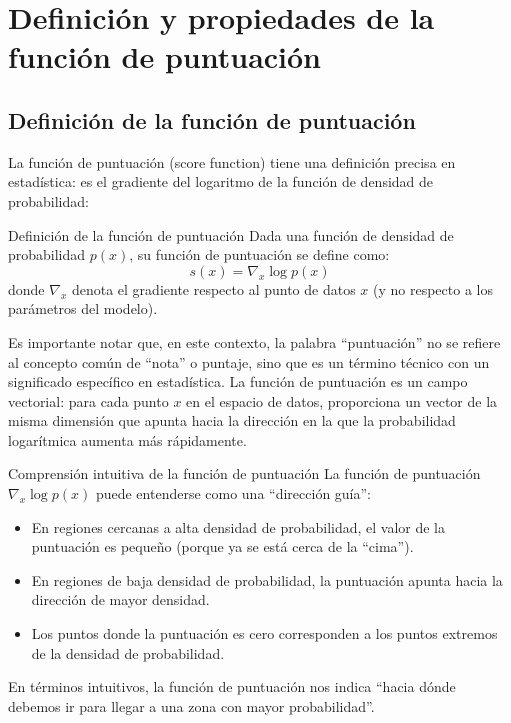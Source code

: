 \section{Definición y propiedades de la función de puntuación}

\subsection{Definición de la función de puntuación}

La función de puntuación (score function) tiene una definición precisa en estadística: es el gradiente del logaritmo de la función de densidad de probabilidad:

\begin{importantbox}{Definición de la función de puntuación}
Dada una función de densidad de probabilidad $p(x)$, su función de puntuación se define como:
$$s(x) = \nabla_x \log p(x)$$
donde $\nabla_x$ denota el gradiente respecto al punto de datos $x$ (y no respecto a los parámetros del modelo).
\end{importantbox}

Es importante notar que, en este contexto, la palabra ``puntuación'' no se refiere al concepto común de ``nota'' o puntaje, sino que es un término técnico con un significado específico en estadística. La función de puntuación es un campo vectorial: para cada punto $x$ en el espacio de datos, proporciona un vector de la misma dimensión que apunta hacia la dirección en la que la probabilidad logarítmica aumenta más rápidamente.

\begin{knowledgebox}{Comprensión intuitiva de la función de puntuación}
La función de puntuación $\nabla_x \log p(x)$ puede entenderse como una ``dirección guía'':
\begin{itemize}
    \item En regiones cercanas a alta densidad de probabilidad, el valor de la puntuación es pequeño (porque ya se está cerca de la ``cima'').
    \item En regiones de baja densidad de probabilidad, la puntuación apunta hacia la dirección de mayor densidad.
    \item Los puntos donde la puntuación es cero corresponden a los puntos extremos de la densidad de probabilidad.
\end{itemize}
En términos intuitivos, la función de puntuación nos indica ``hacia dónde debemos ir para llegar a una zona con mayor probabilidad''.
\end{knowledgebox}

